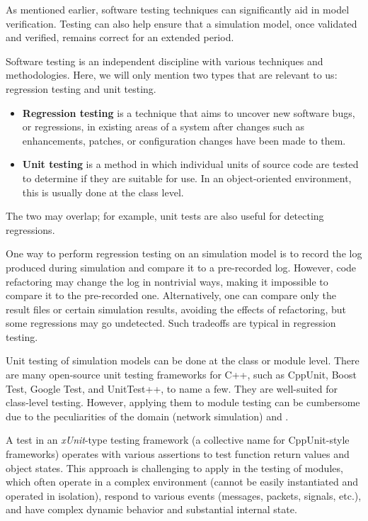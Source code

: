 As mentioned earlier, software testing techniques can significantly aid in model
verification. Testing can also help ensure that a simulation model, once
validated and verified, remains correct for an extended period.

Software testing is an independent discipline with various techniques and
methodologies. Here, we will only mention two types that are relevant to us:
regression testing and unit testing.

\begin{itemize}
  \item \textbf{Regression testing} is a technique that aims to uncover new
    software bugs, or regressions, in existing areas of a system after changes such
    as enhancements, patches, or configuration changes have been made to them.
  \item \textbf{Unit testing} is a method in which individual units of source code
    are tested to determine if they are suitable for use. In an object-oriented
    environment, this is usually done at the class level.
\end{itemize}

The two may overlap; for example, unit tests are also useful for detecting
regressions.

One way to perform regression testing on an {\opp} simulation model is to record
the log produced during simulation and compare it to a pre-recorded log.
However, code refactoring may change the log in nontrivial ways, making it
impossible to compare it to the pre-recorded one. Alternatively, one can compare
only the result files or certain simulation results, avoiding the effects of
refactoring, but some regressions may go undetected. Such tradeoffs are typical
in regression testing.

Unit testing of simulation models can be done at the class or module level.
There are many open-source unit testing frameworks for C++, such as CppUnit,
Boost Test, Google Test, and UnitTest++, to name a few. They are well-suited for
class-level testing. However, applying them to module testing can be cumbersome
due to the peculiarities of the domain (network simulation) and {\opp}.

A test in an \textit{xUnit}-type testing framework (a collective name for
CppUnit-style frameworks) operates with various assertions to test function
return values and object states. This approach is challenging to apply in the
testing of {\opp} modules, which often operate in a complex environment (cannot
be easily instantiated and operated in isolation), respond to various events
(messages, packets, signals, etc.), and have complex dynamic behavior and
substantial internal state.

